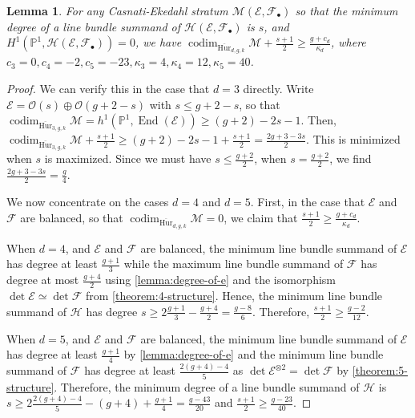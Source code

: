 \documentclass[12 pt]{amsart}
\theoremstyle{plain}
\newtheorem{lemma}[theorem]{Lemma}
\theoremstyle{definition}
\theoremstyle{remark}
\numberwithin{equation}{section}
\newcommand\bp{\mathbb P}
\newcommand\sce{\mathscr E}
\newcommand\scf{\mathscr F}
\newcommand\sch{\mathscr H}
\newcommand\sco{\mathscr O}
\newcommand\bighurg[3]{\overline{\mathrm{Hur}}_{#1,#2, #3}} %
\newcommand\ce{\mathscr M} %
\DeclareMathOperator\codim{codim}
\DeclareMathOperator\End{End}
\begin{document}
\begin{lemma} \label{lemma:smooth-sieve-codimension-bound} For any
	Casnati-Ekedahl stratum $\ce(\sce, \scf_\bullet)$ so that the minimum
	degree of a line bundle summand of $\sch(\sce, \scf_\bullet)$ is $s$,
	and $H^1(\bp^1, \sch(\sce, \scf_\bullet)) = 0$, we have
	$\codim_{\bighurg d
g k} \ce + \frac{s + 1}{2} \geq \frac{g+c_d}{\kappa_d}$, where $c_3 = 0, c_4=
-2, c_5 = -23, \kappa_3 = 4, \kappa_4 = 12, \kappa_5 = 40$.  \end{lemma} 
\begin{proof} 
	We can verify this in the
	case that $d = 3$ directly.  Write $\sce = \sco(s) \oplus \sco(g + 2 -
	s)$ with $s \leq g + 2 -s$, so that $\codim_{\bighurg 3 g k}\ce = h^1(\bp^1, \End(\sce)) \geq (g +
	2) - 2s -1$.  Then, $\codim_{\bighurg 3 g k}\ce  + \frac{s+1}{2} \geq (g+2)
	- 2s - 1 + \frac{s+1}{2} = \frac{2g+3-3s}{2}$.  This is minimized when $s$ is
	maximized. Since we must have $s \leq \frac{g + 2}{2}$, when $s =
	\frac{g + 2}{2}$, we find $\frac{2g+3-3s}{2} = \frac{g}{4}$.

	We now concentrate on the cases $d =4$ and $d = 5$.	First, in the
	case that $\sce$ and $\scf$ are balanced, so that $\codim_{\bighurg d g
	k} \ce = 0$, we claim that $\frac{s + 1}{2} \geq
	\frac{g+c_d}{\kappa_d}$.
	
	When $d = 4$, and $\sce$ and $\scf$ are balanced, the minimum line bundle summand of $\sce$ has degree at
	least $\frac{g + 1}{3}$ while the maximum line bundle summand of $\scf$
	has degree at most $\frac{g+4}{2}$ 
	using \autoref{lemma:degree-of-e} and the isomorphism $\det \sce \simeq \det \scf$ from
	\autoref{theorem:4-structure}.
	Hence, the minimum line bundle
	summand of $\sch$ has degree $s \geq 2 \frac{g + 1}{3} - \frac{g + 4}{2}
	= \frac{g-8}{6}$.  Therefore, $\frac{s+1}{2} \geq \frac{g-2}{12}$.

	When $d = 5$, and $\sce$ and $\scf$ are balanced, the minimum line bundle summand of $\sce$ has degree at
	least $\frac{g + 1}{4}$ 
	by \autoref{lemma:degree-of-e}	
	and the minimum line bundle summand of $\scf$
	has degree at least $\frac{2(g+4)-4}{5}$
	as $\det \sce^{\otimes 2} = \det \scf$
	by \autoref{theorem:5-structure}.
	Therefore, the minimum degree of a line bundle summand of $\sch$ is $s
	\geq 2\frac{2(g+4)-4}{5} - (g+4) + \frac{g+1}{4} = \frac{g-43}{20}$ and
	$\frac{s + 1}{2} \geq \frac{g -23}{40}$.


\end{proof}
\end{document}
